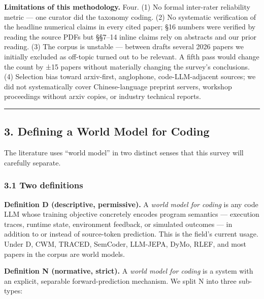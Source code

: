 \documentclass{article}
\begin{document}
\textbf{Limitations of this methodology.} Four. (1) No formal
inter-rater reliability metric --- one curator did the taxonomy coding.
(2) No systematic verification of the headline numerical claims in every
cited paper; §16 numbers were verified by reading the source PDFs but
§§7--14 inline claims rely on abstracts and our prior reading. (3) The
corpus is unstable --- between drafts several 2026 papers we initially
excluded as off-topic turned out to be relevant. A fifth pass would
change the count by ±15 papers without materially changing the survey's
conclusions. (4) Selection bias toward arxiv-first, anglophone,
code-LLM-adjacent sources; we did not systematically cover
Chinese-language preprint servers, workshop proceedings without arxiv
copies, or industry technical reports.

\begin{center}\rule{0.5\linewidth}{0.5pt}\end{center}

\hypertarget{defining-a-world-model-for-coding}{%
\subsection{3. Defining a World Model for
Coding}\label{defining-a-world-model-for-coding}}

The literature uses ``world model'' in two distinct senses that this
survey will carefully separate.

\hypertarget{two-definitions}{%
\subsubsection{3.1 Two definitions}\label{two-definitions}}

\textbf{Definition D (descriptive, permissive).} A \emph{world model for
coding} is any code LLM whose training objective concretely encodes
program semantics --- execution traces, runtime state, environment
feedback, or simulated outcomes --- in addition to or instead of
source-token prediction. This is the field's current usage. Under D,
CWM, TRACED, SemCoder, LLM-JEPA, DyMo, RLEF, and most papers in the
corpus are world models.

\textbf{Definition N (normative, strict).} A \emph{world model for
coding} is a system with an explicit, separable forward-prediction
mechanism. We split N into three sub-types:
\end{document}
